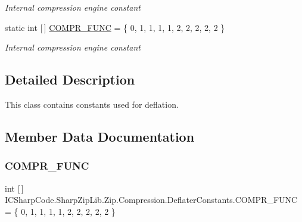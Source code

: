 \begin{DoxyCompactItemize}
\begin{DoxyCompactList}\small\item\em Internal compression engine constant \end{DoxyCompactList}\item 
static int \mbox{[}$\,$\mbox{]} \hyperlink{class_i_c_sharp_code_1_1_sharp_zip_lib_1_1_zip_1_1_compression_1_1_deflater_constants_add031ce120d69a790e66f3fc43de5cd5}{C\+O\+M\+P\+R\+\_\+\+F\+U\+NC} = \{ 0, 1, 1, 1, 1, 2, 2, 2, 2, 2 \}
\begin{DoxyCompactList}\small\item\em Internal compression engine constant \end{DoxyCompactList}\end{DoxyCompactItemize}


\subsection{Detailed Description}
This class contains constants used for deflation. 



\subsection{Member Data Documentation}
\mbox{\label{class_i_c_sharp_code_1_1_sharp_zip_lib_1_1_zip_1_1_compression_1_1_deflater_constants_add031ce120d69a790e66f3fc43de5cd5}} 
\subsubsection{\texorpdfstring{C\+O\+M\+P\+R\+\_\+\+F\+U\+NC}{COMPR\_FUNC}}
{\footnotesize\ttfamily int \mbox{[}$\,$\mbox{]} I\+C\+Sharp\+Code.\+Sharp\+Zip\+Lib.\+Zip.\+Compression.\+Deflater\+Constants.\+C\+O\+M\+P\+R\+\_\+\+F\+U\+NC = \{ 0, 1, 1, 1, 1, 2, 2, 2, 2, 2 \}\hspace{0.3cm}{\ttfamily [static]}}



